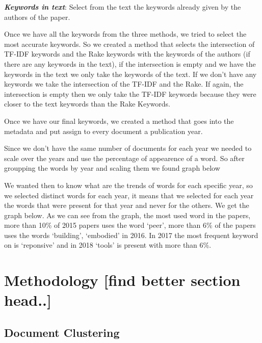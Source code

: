 \documentclass[journal,twocolumn]{IEEEtran}
\begin{document}
    \textbf{\emph{Keywords in text}}: Select from the text the keywords
already given by the authors of the paper.

    Once we have all the keywords from the three methods, we tried to select
the most accurate keywords. So we created a method that selects the
intersection of TF-IDF keywords and the Rake keywords with the keywords
of the authors (if there are any keywords in the text), if the
intersection is empty and we have the keywords in the text we only take
the keywords of the text. If we don't have any keywords we take the
intersection of the TF-IDF and the Rake. If again, the intersection is
empty then we only take the TF-IDF keywords because they were closer to
the text keywords than the Rake Keywords.

    Once we have our final keywords, we created a method that goes into the
metadata and put assign to every document a publication year.


    Since we don't have the same number of documents for each year we needed
to scale over the years and use the percentage of appearence of a word.
So after groupping the words by year and scaling them we found graph
below


    \begin{figure}
        \begin{center}\end{center}
        \caption{}
        \label{}
    \end{figure}
    
    We wanted then to know what are the trends of words for each specific
year, so we selected distinct words for each year, it means that we
selected for each year the words that were present for that year and
never for the others. We get the graph below. As we can see from the
graph, the most used word in the papers, more than 10\% of 2015 papers
uses the word `peer', more than 6\% of the papers uses the words
`building', `embodied' in 2016. In 2017 the most frequent keyword on is
`reponsive' and in 2018 `tools' is present with more than 6\%.

    \hypertarget{methodology-find-better-section-head..}{%
\section{Methodology {[}find better section
head..{]}}\label{methodology-find-better-section-head..}}

    \hypertarget{document-clustering}{%
\subsection{Document Clustering}\label{document-clustering}}
\end{document}
